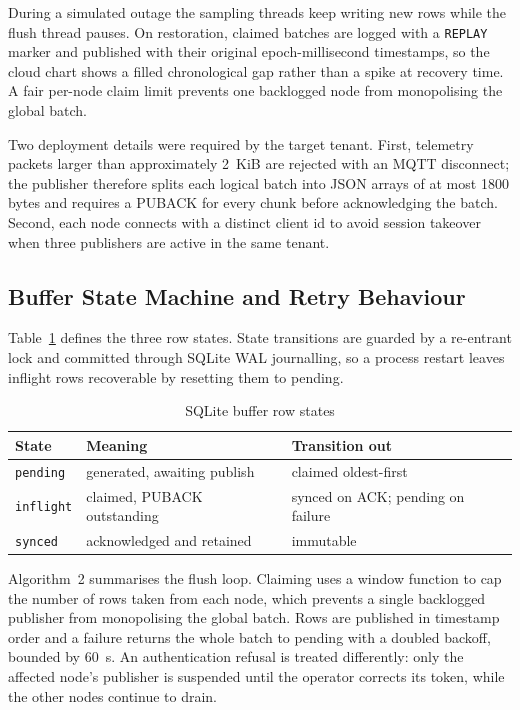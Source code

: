 \documentclass[conference]{IEEEtran}
\begin{document}
During a simulated outage the sampling threads keep writing new rows while the
flush thread pauses. On restoration, claimed batches are logged with a
\texttt{REPLAY} marker and published with their original epoch-millisecond
timestamps, so the cloud chart shows a filled chronological gap rather than a
spike at recovery time. A fair per-node claim limit prevents one backlogged
node from monopolising the global batch.

Two deployment details were required by the target tenant. First, telemetry
packets larger than approximately 2~KiB are rejected with an MQTT disconnect;
the publisher therefore splits each logical batch into JSON arrays of at most
1800 bytes and requires a PUBACK for every chunk before acknowledging the
batch. Second, each node connects with a distinct client id to avoid session
takeover when three publishers are active in the same tenant.

\subsection{Buffer State Machine and Retry Behaviour}

Table~\ref{tab:states} defines the three row states. State transitions are
guarded by a re-entrant lock and committed through SQLite WAL journalling, so a
process restart leaves inflight rows recoverable by resetting them to pending.

\begin{table}[t]
\caption{SQLite buffer row states}
\label{tab:states}
\centering
\scriptsize
\begin{tabular}{@{}lll@{}}
\toprule
State & Meaning & Transition out \\
\midrule
\texttt{pending} & generated, awaiting publish & claimed oldest-first \\
\texttt{inflight} & claimed, PUBACK outstanding & synced on ACK; pending on failure \\
\texttt{synced} & acknowledged and retained & immutable \\
\bottomrule
\end{tabular}
\end{table}

Algorithm~2 summarises the flush loop. Claiming uses a window function to cap the
number of rows taken from each node, which prevents a single backlogged publisher
from monopolising the global batch. Rows are published in timestamp order and a
failure returns the whole batch to pending with a doubled backoff, bounded by
60~s. An authentication refusal is treated differently: only the affected
node's publisher is suspended until the operator corrects its token, while the
other nodes continue to drain.
\end{document}
